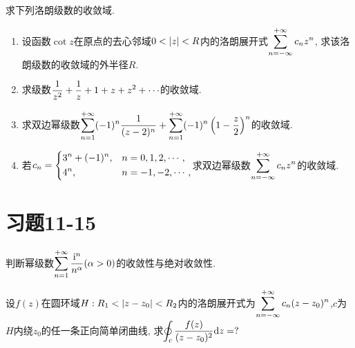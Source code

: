 \begin{yyEx}
	求下列洛朗级数的收敛域.
	\begin{enumerate}
		\item 设函数$\cot z$在原点的去心邻域$0<\lvert z\rvert<R$内的洛朗展开式$\begin{lgathered}
			\sum_{n = -\infty}^{+\infty} c_nz^n
		\end{lgathered}$, 求该洛朗级数的收敛域的外半径$R$.
		\item 求级数$\begin{lgathered}
			\frac{1}{z^2} + \frac{1}{z}+1+z+z^2+\cdots
		\end{lgathered}$的收敛域.
		\item 求双边幂级数$\begin{lgathered}
			\sum_{n = 1}^{+\infty}(-1)^n\frac{1}{(z-2)^n}+\sum_{n = 1}^{+\infty}(-1)^n\left( 1-\frac{z}{2} \right)^n
		\end{lgathered}$的收敛域.
		\item 若$\begin{lgathered}
			c_n = \begin{dcases}
				3^n+(-1)^n,&n = 0,1,2,\cdots,\\
				4^n,&n = -1,-2,\cdots,
			\end{dcases}
		\end{lgathered}$求双边幂级数$\begin{lgathered}
			\sum_{n = -\infty}^{+\infty}c_nz^n
		\end{lgathered}$的收敛域.
	\end{enumerate}
\end{yyEx}

\section{习题11-15}

\begin{yyEx}
	判断幂级数$\begin{lgathered}
		\sum_{n = 1}^{+\infty}\frac{\mathrm{i}^n}{n^{\alpha}}(\alpha>0)
	\end{lgathered}$的收敛性与绝对收敛性.
\end{yyEx}

\begin{yyEx}
	设$f(z)$在圆环域$H:R_1<\lvert z-z_0\rvert<R_2$内的洛朗展开式为$\begin{lgathered}
	\sum_{n = -\infty}^{+\infty}c_n(z-z_0)^n
	\end{lgathered}$,$c$为$H$内绕$z_0$的任一条正向简单闭曲线, 求$\begin{lgathered}
		\oint_c\frac{f(z)}{(z-z_0)^2}\mathrm{d}z = ?
	\end{lgathered}$
\end{yyEx}

